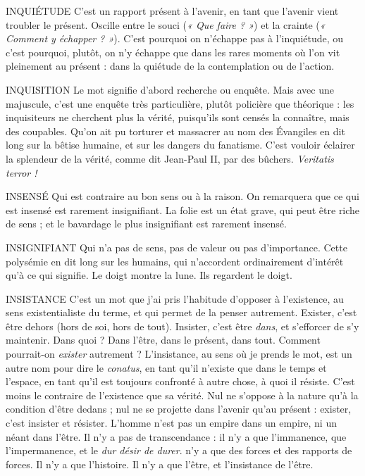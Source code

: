 INQUIÉTUDE C’est un rapport présent à l’avenir, en tant que l’avenir
vient troubler le présent. Oscille entre le souci ({\it « Que faire ? »})
et la crainte ({\it « Comment y échapper ? »}). C’est pourquoi on n’échappe pas à l’inquiétude,
ou c’est pourquoi, plutôt, on n’y échappe que dans les rares moments où l’on
vit pleinement au présent : dans la quiétude de la contemplation ou de l’action.

INQUISITION Le mot signifie d’abord recherche ou enquête. Mais avec
une majuscule, c’est une enquête très particulière, plutôt
policière que théorique : les inquisiteurs ne cherchent plus la vérité, puisqu'ils
sont censés la connaître, mais des coupables. Qu’on ait pu torturer et massacrer
au nom des Évangiles en dit long sur la bêtise humaine, et sur les dangers du
fanatisme. C’est vouloir éclairer la splendeur de la vérité, comme dit Jean-Paul II,
par des bûchers. {\it Veritatis terror !}

INSENSÉ Qui est contraire au bon sens ou à la raison.
On remarquera que ce qui est insensé est rarement insignifiant.
La folie est un état grave, qui peut être riche de sens ; et le bavardage le plus
insignifiant est rarement insensé.

INSIGNIFIANT Qui n’a pas de sens, pas de valeur ou pas d'importance.
Cette polysémie en dit long sur les humains, qui n’accordent
ordinairement d'intérêt qu’à ce qui signifie. Le doigt montre la lune. Ils
regardent le doigt.

INSISTANCE C’est un mot que j'ai pris l’habitude d’opposer à l'existence,
au sens existentialiste du terme, et qui permet de la penser
autrement. Exister, c’est être dehors (hors de soi, hors de tout). Insister, c’est
être {\it dans}, et s’efforcer de s’y maintenir. Dans quoi ? Dans l’être, dans le présent,
dans tout. Comment pourrait-on {\it exister} autrement ? L’insistance, au sens
où je prends le mot, est un autre nom pour dire le {\it conatus}, en tant qu’il n'existe
que dans le temps et l’espace, en tant qu’il est toujours confronté à autre chose,
à quoi il résiste. C’est moins le contraire de l'existence que sa vérité. Nul ne
s'oppose à la nature qu’à la condition d’être dedans ; nul ne se projette dans
l'avenir qu’au présent : exister, c’est insister et résister. L’homme n’est pas un
empire dans un empire, ni un néant dans l’être. Il n’y a pas de transcendance :
il n’y a que l’immanence, que l’impermanence, et le {\it dur désir de durer}. n’y a
que des forces et des rapports de forces. Il n’y a que l’histoire. Il n’y a que l'être,
et l’insistance de l’être.

